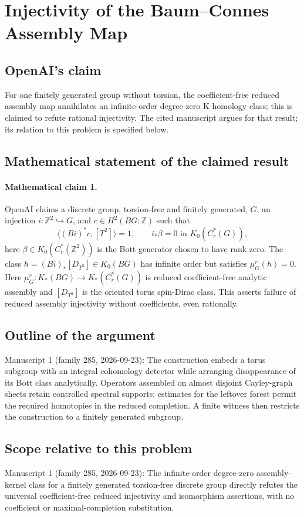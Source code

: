 \documentclass[11pt]{article}
\begin{document}
\section*{Injectivity of the Baum–Connes Assembly Map}

\subsection{OpenAI's claim}
For one finitely generated group without torsion, the coefficient-free reduced assembly map annihilates an infinite-order degree-zero K-homology class; this is claimed to refute rational injectivity. The cited manuscript argues for that result; its relation to this problem is specified below.

\subsection{Mathematical statement of the claimed result}
\paragraph{Mathematical claim 1.} OpenAI claims a discrete group, torsion-free and finitely generated, $G$, an injection $i:\mathbb Z^2\hookrightarrow G$, and $c\in H^2(BG;\mathbb Z)$ such that
\[
\langle(Bi)^*c,[T^2]\rangle=1,\qquad
 i_*\beta=0\text{ in }K_0(C_r^*(G)),
\]
here $\beta\in K_0(C_r^*(\mathbb Z^2))$ is the Bott generator chosen to have rank zero. The class $h=(Bi)_*[D_{T^2}]\in K_0(BG)$ has infinite order but satisfies $\mu_G^r(h)=0$. Here $\mu_G^r:K_*(BG)\to K_*(C_r^*(G))$ is reduced coefficient-free analytic assembly and $[D_{T^2}]$ is the oriented torus spin-Dirac class. This asserts failure of reduced assembly injectivity without coefficients, even rationally.

\subsection{Outline of the argument}
Manuscript 1 (family 285, 2026-09-23): The construction embeds a torus subgroup with an integral cohomology detector while arranging disappearance of its Bott class analytically. Operators assembled on almost disjoint Cayley-graph sheets retain controlled spectral supports; estimates for the leftover forest permit the required homotopies in the reduced completion. A finite witness then restricts the construction to a finitely generated subgroup.

\subsection{Scope relative to this problem}
Manuscript 1 (family 285, 2026-09-23): The infinite-order degree-zero assembly-kernel class for a finitely generated torsion-free discrete group directly refutes the universal coefficient-free reduced injectivity and isomorphism assertions, with no coefficient or maximal-completion substitution.
\end{document}
